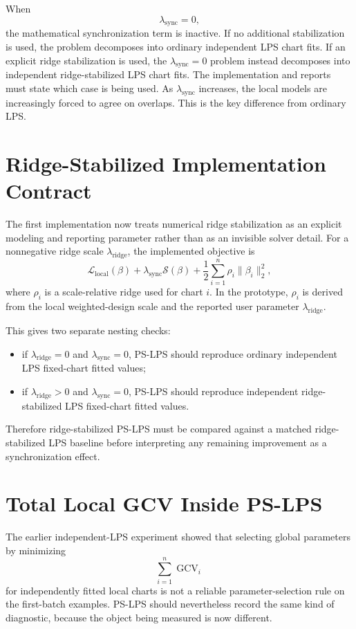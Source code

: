 \documentclass[11pt]{article}
\begin{document}
When
\[
  \lambda_{\mathrm{sync}}=0,
\]
the mathematical synchronization term is inactive.  If no additional
stabilization is used, the problem decomposes into ordinary independent LPS
chart fits.  If an explicit ridge stabilization is used, the
\(\lambda_{\mathrm{sync}}=0\) problem instead decomposes into independent
ridge-stabilized LPS chart fits.  The implementation and reports must state
which case is being used.  As \(\lambda_{\mathrm{sync}}\) increases, the local
models are increasingly forced to agree on overlaps.  This is the key
difference from ordinary LPS.

\section{Ridge-Stabilized Implementation Contract}

The first implementation now treats numerical ridge stabilization as an
explicit modeling and reporting parameter rather than as an invisible solver
detail.  For a nonnegative ridge scale
\(\lambda_{\mathrm{ridge}}\), the implemented objective is
\[
  \mathcal L_{\mathrm{local}}(\beta)
  +
  \lambda_{\mathrm{sync}}\mathcal S(\beta)
  +
  \frac12
  \sum_{i=1}^{n}
  \rho_i
  \|\beta_i\|_2^2,
\]
where \(\rho_i\) is a scale-relative ridge used for chart \(i\).  In the
prototype, \(\rho_i\) is derived from the local weighted-design scale and the
reported user parameter \(\lambda_{\mathrm{ridge}}\).

This gives two separate nesting checks:
\begin{itemize}[leftmargin=*]
  \item if \(\lambda_{\mathrm{ridge}}=0\) and
    \(\lambda_{\mathrm{sync}}=0\), PS-LPS should reproduce ordinary
    independent LPS fixed-chart fitted values;
  \item if \(\lambda_{\mathrm{ridge}}>0\) and
    \(\lambda_{\mathrm{sync}}=0\), PS-LPS should reproduce independent
    ridge-stabilized LPS fixed-chart fitted values.
\end{itemize}
Therefore ridge-stabilized PS-LPS must be compared against a matched
ridge-stabilized LPS baseline before interpreting any remaining improvement as
a synchronization effect.

\section{Total Local GCV Inside PS-LPS}

The earlier independent-LPS experiment showed that selecting global parameters
by minimizing
\[
  \sum_{i=1}^{n}\operatorname{GCV}_i
\]
for independently fitted local charts is not a reliable parameter-selection
rule on the first-batch examples.  PS-LPS should nevertheless record the same
kind of diagnostic, because the object being measured is now different.
\end{document}
